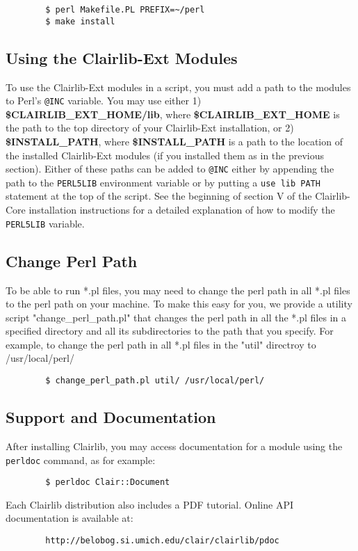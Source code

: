\begin{verbatim}
        $ perl Makefile.PL PREFIX=~/perl
        $ make install
\end{verbatim}
\subsection*{Using the Clairlib-Ext Modules\label{Using_the_Clairlib-Ext_Modules}}


To use the Clairlib-Ext modules in a script, you must add a path to the modules to Perl's \texttt{@INC} variable. You may use either 1) \textbf{\$CLAIRLIB\_EXT\_HOME/lib}, where \textbf{\$CLAIRLIB\_EXT\_HOME} is the path to the top directory of your Clairlib-Ext installation, or 2) \textbf{\$INSTALL\_PATH}, where \textbf{\$INSTALL\_PATH} is a path to the location of the installed Clairlib-Ext modules (if you installed them as in the previous section). Either of these paths can be added to \texttt{@INC} either by appending the path to the \texttt{PERL5LIB} environment variable or by putting a \texttt{use lib PATH} statement at the top of the script. See the beginning of section V of the Clairlib-Core installation instructions for a detailed explanation of how to modify the \texttt{PERL5LIB} variable.

\subsection*{Change Perl Path\label{Change_Perl_Path}}


To be able to run *.pl files, you may need to change the perl path in all *.pl files to the perl path on your machine. To make this easy for you, we provide a utility script "change\_perl\_path.pl" that changes the perl path in all the *.pl files in a specified directory and all its subdirectories to the path that you specify.
For example, to change the perl path in all *.pl files in the "util" directroy to /usr/local/perl/

\begin{verbatim}
        $ change_perl_path.pl util/ /usr/local/perl/
\end{verbatim}
\subsection*{Support and Documentation\label{Support_and_Documentation}}


After installing Clairlib, you may access documentation for a module using the \texttt{perldoc} command, as for example:

\begin{verbatim}
        $ perldoc Clair::Document
\end{verbatim}


Each Clairlib distribution also includes a PDF tutorial. Online API documentation is available at:

\begin{verbatim}
        http://belobog.si.umich.edu/clair/clairlib/pdoc
\end{verbatim}
